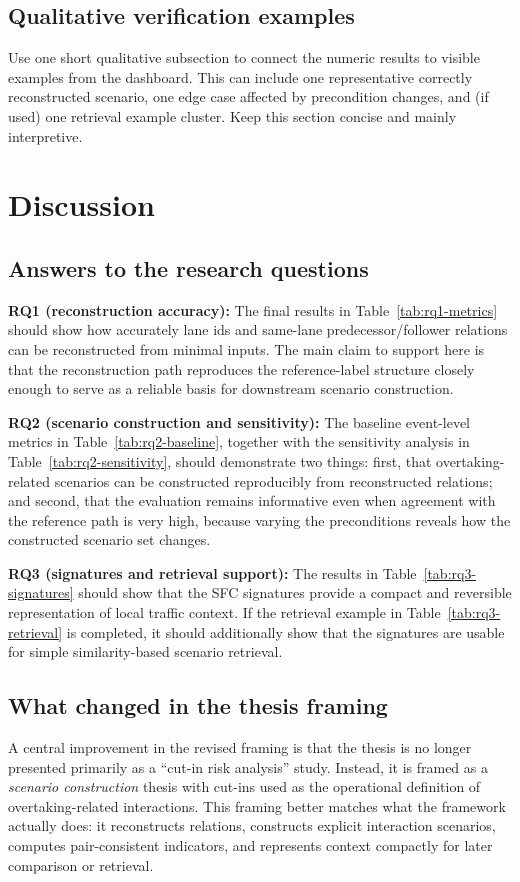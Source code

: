 \documentclass[12pt,a4paper,twoside,openright]{report}
\begin{document}
    \section{Qualitative verification examples}
    Use one short qualitative subsection to connect the numeric results to visible examples from the dashboard. This can include one representative correctly reconstructed scenario, one edge case affected by precondition changes, and (if used) one retrieval example cluster. Keep this section concise and mainly interpretive.

    \chapter{Discussion}
    \label{chap:discussion}

    \section{Answers to the research questions}
    \textbf{RQ1 (reconstruction accuracy):} The final results in Table~\ref{tab:rq1-metrics} should show how accurately lane ids and same-lane predecessor/follower relations can be reconstructed from minimal inputs. The main claim to support here is that the reconstruction path reproduces the reference-label structure closely enough to serve as a reliable basis for downstream scenario construction.

    \textbf{RQ2 (scenario construction and sensitivity):} The baseline event-level metrics in Table~\ref{tab:rq2-baseline}, together with the sensitivity analysis in Table~\ref{tab:rq2-sensitivity}, should demonstrate two things: first, that overtaking-related scenarios can be constructed reproducibly from reconstructed relations; and second, that the evaluation remains informative even when agreement with the reference path is very high, because varying the preconditions reveals how the constructed scenario set changes.

    \textbf{RQ3 (signatures and retrieval support):} The results in Table~\ref{tab:rq3-signatures} should show that the SFC signatures provide a compact and reversible representation of local traffic context. If the retrieval example in Table~\ref{tab:rq3-retrieval} is completed, it should additionally show that the signatures are usable for simple similarity-based scenario retrieval.

    \section{What changed in the thesis framing}
    A central improvement in the revised framing is that the thesis is no longer presented primarily as a ``cut-in risk analysis'' study. Instead, it is framed as a \emph{scenario construction} thesis with cut-ins used as the operational definition of overtaking-related interactions. This framing better matches what the framework actually does: it reconstructs relations, constructs explicit interaction scenarios, computes pair-consistent indicators, and represents context compactly for later comparison or retrieval.
\end{document}
